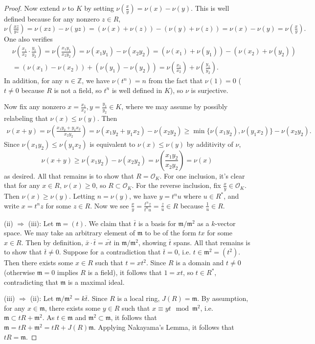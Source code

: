 \documentclass{article}
\theoremstyle{customplain}
\theoremstyle{customdef}
\newcommand{\Z}{\mathbb{Z}}
\newcommand{\calO}{\mathcal{O}}
\newcommand{\frkm}{\mathfrak{m}}
\theoremstyle{definition} %
\renewcommand{\le}{\leqslant}
\renewcommand{\ge}{\geqslant}
\begin{document}
\begin{proof}
    Now extend $\nu$ to $K$ by setting $\nu(\frac{x}{y})=\nu(x)-\nu(y).$ This is well defined because for any nonzero $z\in R$, $\nu(\frac{xz}{yz}) = \nu(xz)-\nu(yz)=\left(\nu(x)+\nu(z)\right)-\left(\nu(y)+\nu(z)\right)=\nu(x)-\nu(y)=\nu(\frac{x}{y}).$ One also verifies
    \begin{align*}
    &\nu(\frac{x_1}{x_2} \cdot \frac{y_1}{y_2}) = \nu(\frac{x_1y_1}{x_2y_2}) = \nu(x_1y_1)-\nu(x_2y_2)
    =(\nu(x_1)+\nu(y_1))-(\nu(x_2)+\nu(y_2))\\
    &=(\nu(x_1)-\nu(x_2))+(\nu(y_1)-\nu(y_2))=\nu(\frac{x_1}{x_2})+\nu(\frac{y_1}{y_2}).
    \end{align*}
    In addition, for any $n\in \Z$, we have $\nu(t^n)=n$ from the fact that $\nu(1)=0$ ($t\ne 0$ because $R$ is not a field, so $t^n$ is well defined in $K$), so $\nu$ is surjective.

    Now fix any nonzero $x=\frac{x_1}{x_2}, y = \frac{y_1}{y_2}\in K$, where we may assume by possibly relabeling that $\nu(x)\le \nu(y).$ Then
    \begin{align*}
        \nu(x+y) = \nu(\frac{x_1y_2+y_1x_2}{x_2y_2})= \nu(x_1y_2+y_1x_2)-\nu(x_2y_2) \ge \min \{\nu(x_1y_2), \nu(y_1x_2)\} - \nu(x_2y_2).
    \end{align*}
    Since $\nu(x_1y_2)\le \nu(y_1x_2)$ is equivalent to $\nu(x)\le \nu(y)$ by additivity of $\nu$,
    \[
    \nu(x+y) \ge \nu(x_1y_2)-\nu(x_2y_2) = \nu(\frac{x_1y_2}{x_2y_2})=\nu(x)
    \]
    as desired. All that remains is to show that $R = \calO_K.$ For one inclusion, it's clear that for any $x\in R$, $\nu(x) \ge 0$, so $R\subset \calO_K.$ For the reverse inclusion, fix $\frac{x}{y}\in \calO_K.$ Then $\nu(x)\ge \nu(y)$. Letting $n=\nu(y)$, we have $y=t^n u$ where $u\in R^*$, and write $x=t^n z$ for some $z\in R.$ Now we see $\frac{x}{y}=\frac{t^n z}{t^n u} = \frac{z}{u}\in R$ because $\frac{1}{u}\in R$.

    \vspace{0.1in}
    (ii) $\Rightarrow$ (iii):
    Let $\frkm = (t)$. We claim that $\bar t$ is a basis for $\frkm/\frkm^2$ as a $k$-vector space. We may take an arbitrary element of $\frkm$ to be of the form $tx$ for some $x\in R.$ Then by definition, $\bar x \cdot \bar t = \bar{xt}$ in $\frkm/\frkm^2$, showing $\bar t$ spans. All that remains is to show that $\bar t \ne 0.$ Suppose for a contradiction that $\bar t =0$, i.e. $t\in \frkm^2=(t^2)$. Then there exists some $x\in R$ such that $t=xt^2$. Since $R$ is a domain and $t\ne 0$ (otherwise $\frkm = 0$ implies $R$ is a field), it follows that $1=xt$, so $t\in R^*$, contradicting that $\frkm$ is a maximal ideal.

    \vspace{0.1in}
    (iii) $\Rightarrow$ (ii):
    Let $\frkm/\frkm^2=k\bar t$. Since $R$ is a local ring, $J(R)=\frkm$. By assumption, for any $x\in \frkm$, there exists some $y\in R$ such that $x \equiv yt \mod \frkm^2$, i.e. $\frkm \subset tR+\frkm^2.$ As $t\in \frkm$ and $\frkm^2\subset \frkm$, it follows that $\frkm = tR+\frkm^2=tR+J(R)\frkm.$ Applying Nakayama's Lemma, it follows that $tR = \frkm$.
    \end{proof}
\end{document}
